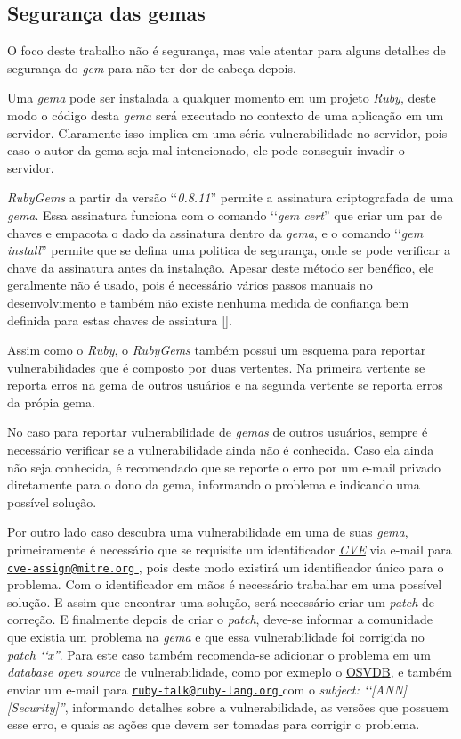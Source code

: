 \subsection{Segurança das gemas}

O foco deste trabalho não é segurança, mas vale atentar para alguns detalhes de segurança do \emph{gem} para
não ter dor de cabeça depois.

Uma \emph{gema} pode ser instalada a qualquer momento em um projeto \emph{Ruby}, deste modo o código desta
\emph{gema} será executado no contexto de uma aplicação em um servidor. Claramente isso implica em uma séria
vulnerabilidade no servidor, pois caso o autor da gema seja mal intencionado, ele pode conseguir invadir o
servidor.

\emph{RubyGems} a partir da versão ‘‘\emph{0.8.11}'' permite a assinatura criptografada de uma \emph{gema}. Essa
assinatura funciona com o comando ‘‘\emph{gem cert}'' que criar um par de chaves e empacota o dado da
assinatura dentro da \emph{gema}, e o comando ‘‘\emph{gem install}'' permite que se defina uma politica de
segurança, onde se pode verificar a chave da assinatura antes da instalação. Apesar deste método
ser benéfico, ele geralmente não é usado, pois é necessário vários passos manuais no desenvolvimento e
também não existe nenhuma medida de confiança bem definida para estas chaves de assintura
[].

Assim como o \emph{Ruby}, o \emph{RubyGems} também possui um esquema para reportar vulnerabilidades que
é composto por duas vertentes. Na primeira vertente se reporta erros na gema de outros usuários e na
segunda vertente se reporta erros da própia gema.

No caso para reportar vulnerabilidade de \emph{gemas} de outros usuários, sempre é necessário verificar
se a vulnerabilidade ainda não é conhecida. Caso ela ainda não seja conhecida, é recomendado que se
reporte o erro por um e-mail privado diretamente para o dono da gema, informando o problema e
indicando uma possível solução.

Por outro lado caso descubra uma vulnerabilidade em uma de suas \emph{gema}, primeiramente
é necessário que se requisite um identificador \emph{\href{https://cve.mitre.org/}{CVE}} via e-mail para
\href{mailto:cve-assign@mitre.org}{\nolinkurl{cve-assign@mitre.org} }, pois deste modo existirá
um identificador único para o problema. Com o identificador em mãos é necessário trabalhar em uma
possível solução. E assim que encontrar uma solução, será necessário criar um \emph{patch} de correção.
E finalmente depois de criar o \emph{patch}, deve-se informar a comunidade que existia um problema na
\emph{gema} e que essa vulnerabilidade foi corrigida no \emph{patch ‘‘x''}. Para este caso também
recomenda-se adicionar o problema em um \emph{database open source} de vulnerabilidade, como por exmeplo o
\href{http://osvdb.org/}{OSVDB}, e também enviar um e-mail para \href{mailto:ruby-talk@ruby-lang.org}
{\nolinkurl{ruby-talk@ruby-lang.org} } com o \emph{subject: ‘‘[ANN][Security]''}, informando detalhes
sobre a vulnerabilidade, as versões que possuem esse erro, e quais as ações que devem ser tomadas
para corrigir o problema.
